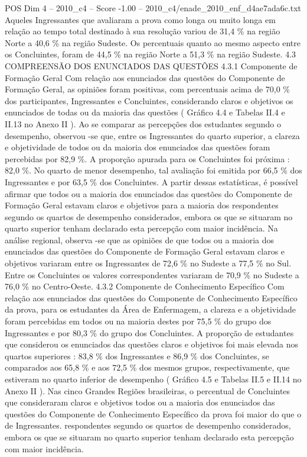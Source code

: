 \begin{textsample}{POS Dim 4 – 2010\_c4 – Score -1.00 – 2010\_c4/enade\_2010\_enf\_d4ae7ada6c.txt}
Aqueles Ingressantes que avaliaram a prova como longa ou muito longa em relação ao tempo total destinado à sua resolução variou de 31,4 \% na região Norte a 40,6 \% na região Sudeste.
Os percentuais quanto ao mesmo aspecto entre os Concluintes, foram de 44,5 \% na região Norte a 51,3 \% na região Sudeste. 4.3 COMPREENSÃO DOS ENUNCIADOS DAS QUESTÕES 4.3.1 Componente de Formação Geral Com relação aos enunciados das questões do Componente de Formação Geral, as opiniões foram positivas, com percentuais acima de 70,0 \% dos participantes, Ingressantes e Concluintes, considerando claros e objetivos os enunciados de todas ou da maioria das questões ( Gráfico 4.4 e Tabelas II.4 e II.13 no Anexo II ).
Ao se comparar as percepções dos estudantes segundo o desempenho, observou -se que, entre os Ingressantes do quarto superior, a clareza e objetividade de todos ou da maioria dos enunciados das questões foram percebidas por 82,9 \%.
A proporção apurada para os Concluintes foi próxima : 82,0 \%.
No quarto de menor desempenho, tal avaliação foi emitida por 66,5 \% dos Ingressantes e por 63,5 \% dos Concluintes.
A partir dessas estatísticas, é possível afirmar que todos ou a maioria dos enunciados das questões do Componente de Formação Geral estavam claros e objetivos para a maioria dos respondentes segundo os quartos de desempenho considerados, embora os que se situaram no quarto superior tenham declarado esta percepção com maior incidência.
Na análise regional, observa -se que as opiniões de que todos ou a maioria dos enunciados das questões do Componente de Formação Geral estavam claros e objetivos variaram entre os Ingressantes de 72,6 \% no Sudeste a 77,5 \% no Sul.
Entre os Concluintes os valores correspondentes variaram de 70,9 \% no Sudeste a 76,0 \% no Centro-Oeste. 4.3.2 Componente de Conhecimento Específico Com relação aos enunciados das questões do Componente de Conhecimento Específico da prova, para os estudantes da Área de Enfermagem, a clareza e a objetividade foram percebidas em todos ou na maioria destes por 75,5 \% do grupo dos Ingressantes e por 80,3 \% do grupo dos Concluintes.
A proporção de estudantes que considerou os enunciados das questões claros e objetivos foi mais elevada nos quartos superiores : 83,8 \% dos Ingressantes e 86,9 \% dos Concluintes, se comparados aos 65,8 \% e aos 72,5 \% dos mesmos grupos, respectivamente, que estiveram no quarto inferior de desempenho ( Gráfico 4.5 e Tabelas II.5 e II.14 no Anexo II ).
Nas cinco Grandes Regiões brasileiras, o percentual de Concluintes que consideraram claros e objetivos todos ou a maioria dos enunciados das questões do Componente de Conhecimento Específico da prova foi maior do que o de Ingressantes. respondentes segundo os quartos de desempenho considerados, embora os que se situaram no quarto superior tenham declarado esta percepção com maior incidência.

\end{textsample}
